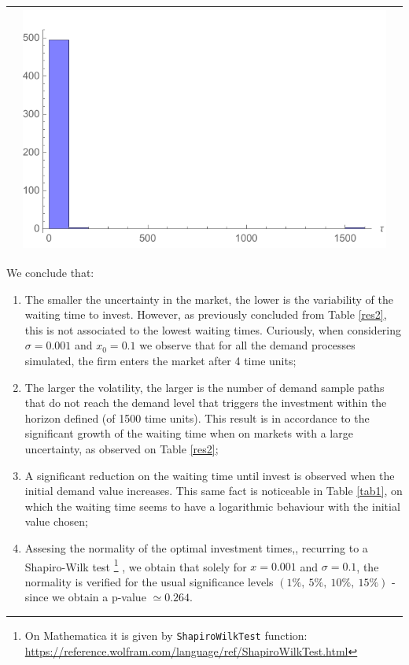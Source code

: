 \begin{table}[!htb]
\begin{tabular}{c|c|c}
\begin{minipage}{.45\textwidth}
		\end{minipage}
		& \begin{minipage}{.45\textwidth}
			\includegraphics[width=\linewidth]{StopTime/x01o5.pdf}
		\end{minipage} \\ \hline
	\end{tabular}
	\label{hist}
\end{table}


We conclude that:
\begin{enumerate}
	\item The smaller the uncertainty in the market, the lower is the variability of the waiting time to invest.
	However, as previously concluded from Table \ref{res2}, this is not associated to the lowest waiting times.
	Curiously, when considering $\sigma=0.001$ and $x_0=0.1$ we observe that for all the demand processes simulated, the firm enters the market after 4 time units;
	
	\item The larger the volatility, the larger is the number of demand sample paths that do not reach the demand level that triggers the investment within the horizon defined (of 1500 time units). This result is in accordance to the significant growth of the waiting time when on markets with a large uncertainty, as observed on Table \ref{res2};
	
	\item A significant reduction on the waiting time until invest is observed when the initial demand value increases. This same fact is noticeable in Table \ref{tab1}, on which the waiting time seems to have a logarithmic behaviour with the initial value chosen;
	
	\item Assesing the normality of the optimal investment times,, recurring to a Shapiro-Wilk test \cite{sw}\footnote{On Mathematica it is given by \texttt{ShapiroWilkTest} function: \\
	\url{https://reference.wolfram.com/language/ref/ShapiroWilkTest.html}}
		, we obtain that solely for $x=0.001$ and $\sigma=0.1$, the normality is verified for the usual significance levels $(1\%, \ 5\%, \ 10\%, \ 15\%)$ - since we obtain a p-value $\simeq 0.264$.
\end{enumerate}


